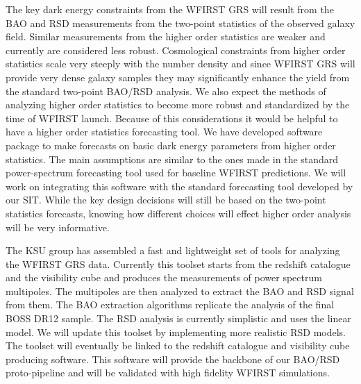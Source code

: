  The key dark energy constraints from the WFIRST GRS will result from the BAO and
 RSD measurements from the two-point statistics of the observed galaxy field.
 Similar measurements from the higher order statistics are weaker and currently
 are considered less robust. Cosmological constraints from higher order
 statistics scale very steeply with the number density and since WFIRST GRS will
 provide very dense galaxy samples they may significantly enhance the yield from
 the standard two-point BAO/RSD analysis. We also expect the methods of analyzing
 higher order statistics to become more robust and standardized by the time of
 WFIRST launch. Because of this considerations it would be helpful to have a
 higher order statistics forecasting tool. We have developed software package to
 make forecasts on basic dark energy parameters from higher order statistics.
 The main assumptions are similar to the ones made in the standard
 power-spectrum forecasting tool used for baseline WFIRST predictions. We will
 work on integrating this software with the standard forecasting tool developed
 by our SIT. While the key design decisions will still be based on the
 two-point statistics forecasts, knowing how different choices will effect higher
 order analysis will be very informative.

 The KSU group has assembled a fast and lightweight set of tools for analyzing
 the WFIRST GRS data. Currently this toolset starts from the redshift catalogue
 and the visibility cube and produces the measurements of power spectrum
 multipoles. The multipoles are then analyzed to extract the BAO and RSD signal
 from them. The BAO extraction algorithms replicate the analysis of the final
 BOSS DR12 sample. The RSD analysis is currently simplistic and uses the linear
 model. We will update this toolset by implementing more realistic RSD models.
 The toolset will eventually be linked to the redshift catalogue and visibility
 cube producing software. This software will provide the backbone of our BAO/RSD
 proto-pipeline and will be validated with high fidelity WFIRST simulations.

